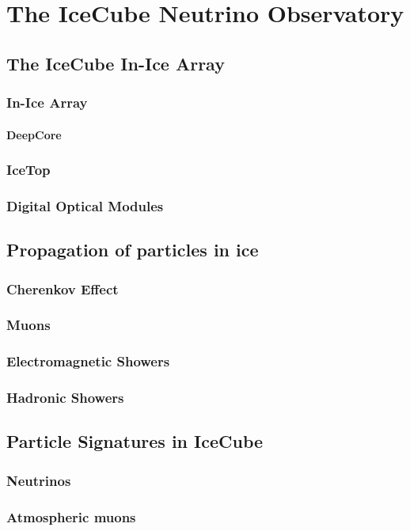 \setchapterpreamble[u]{\margintoc}

\chapter{The IceCube Neutrino Observatory}

\section{The IceCube In-Ice Array}

\subsection{In-Ice Array}

\subsubsection{DeepCore}

\subsection{IceTop}

\subsection{Digital Optical Modules}


\section{Propagation of particles in ice}

\subsection{Cherenkov Effect}

\subsection{Muons}

\subsection{Electromagnetic Showers}

\subsection{Hadronic Showers}


\section{Particle Signatures in IceCube}

\subsection{Neutrinos}

\subsection{Atmospheric muons}
